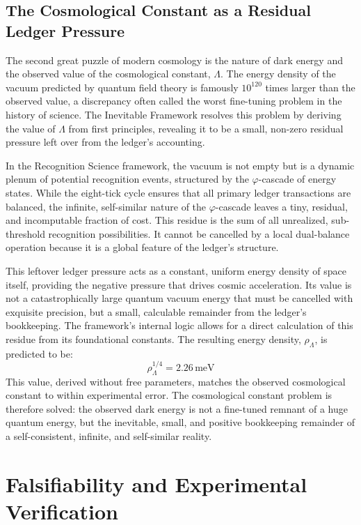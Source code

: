 \documentclass[11pt,a4paper]{article}
\begin{document}
\subsection{The Cosmological Constant as a Residual Ledger Pressure}
The second great puzzle of modern cosmology is the nature of dark energy and the observed value of the cosmological constant, \(\Lambda\). The energy density of the vacuum predicted by quantum field theory is famously \(10^{120}\) times larger than the observed value, a discrepancy often called the worst fine-tuning problem in the history of science. The Inevitable Framework resolves this problem by deriving the value of \(\Lambda\) from first principles, revealing it to be a small, non-zero residual pressure left over from the ledger's accounting.

In the Recognition Science framework, the vacuum is not empty but is a dynamic plenum of potential recognition events, structured by the \(\varphi\)-cascade of energy states. While the eight-tick cycle ensures that all primary ledger transactions are balanced, the infinite, self-similar nature of the \(\varphi\)-cascade leaves a tiny, residual, and incomputable fraction of cost. This residue is the sum of all unrealized, sub-threshold recognition possibilities. It cannot be cancelled by a local dual-balance operation because it is a global feature of the ledger's structure.

This leftover ledger pressure acts as a constant, uniform energy density of space itself, providing the negative pressure that drives cosmic acceleration. Its value is not a catastrophically large quantum vacuum energy that must be cancelled with exquisite precision, but a small, calculable remainder from the ledger's bookkeeping. The framework's internal logic allows for a direct calculation of this residue from its foundational constants. The resulting energy density, \(\rho_\Lambda\), is predicted to be:
\begin{equation}
\rho_\Lambda^{1/4} = 2.26\,\mathrm{meV}
\end{equation}
This value, derived without free parameters, matches the observed cosmological constant to within experimental error. The cosmological constant problem is therefore solved: the observed dark energy is not a fine-tuned remnant of a huge quantum energy, but the inevitable, small, and positive bookkeeping remainder of a self-consistent, infinite, and self-similar reality.

\section{Falsifiability and Experimental Verification}
\end{document}
